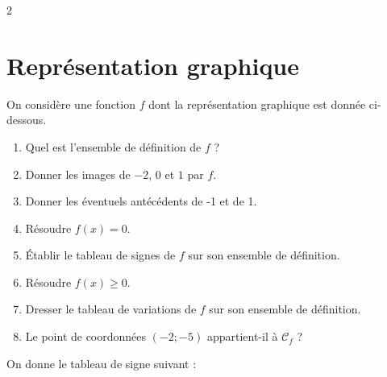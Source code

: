 \documentclass[10pt,a4paper]{article}
\begin{document}
\begin{multicols}{2}

\section{Représentation graphique}

\begin{exo}[Rappels][]
On considère une fonction \(f\) dont la représentation graphique est donnée ci-dessous.


\begin{enumerate}[leftmargin=*]
    \item Quel est l'ensemble de définition de \(f\) ?
    \item Donner les images de \(-2\), \(0\) et \(1\) par \(f\).
    \item Donner les éventuels antécédents de -1 et de 1.
    \item Résoudre \(f(x)=0\).
    \item Établir le tableau de signes de \(f\) sur son ensemble de définition.
    \item Résoudre \(f(x) \geq 0\).
    \item Dresser le tableau de variations de \(f\) sur son ensemble de définition.
    \item Le point de coordonnées \((-2;-5)\) appartient-il à \(\mathcal{C}_f\) ?
\end{enumerate}
\end{exo}


\begin{exo}[][appro]
    
On donne le tableau de signe suivant :

\begin{center}
\end{center}


\end{exo}
\end{multicols}
\end{document}
